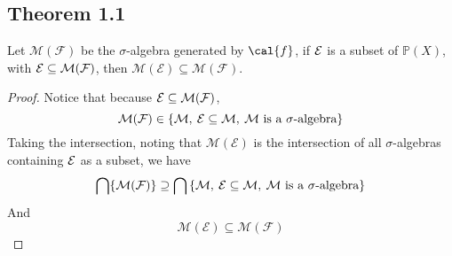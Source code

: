 \documentclass[../../main.tex]{subfiles}
\begin{document}
\newcommand{\me}{\mathcal{M}(\mathcal{E})}
\newcommand{\mf}{\mathcal{M}(\mathcal{F})}
\subsection{Theorem 1.1}
\begin{wts}
    Let $\mf$ be the $\sigma$-algebra generated by $\cal{f}$, if $\cal{E}$ is a subset of $\mathbb{P}(X)$, with $\cal{E}\subseteq\mf$, then $\me\subseteq\mf$.
\end{wts}
\begin{proof}
    Notice that because $\cal{E}\subseteq\mf$, 
    \[
    \mf\in\left\{\cal{M},\:\cal{E}\subseteq \cal{M},\:\text{$\cal{M}$ is a $\sigma$-algebra}\right\}
    \]
    Taking the intersection, noting that $\me$ is the intersection of all $\sigma$-algebras containing $\cal{E}$ as a subset, we have
    \[
    \bigcap \{\mf\}\supseteq \bigcap \left\{\cal{M},\:\cal{E}\subseteq \cal{M},\:\text{$\cal{M}$ is a $\sigma$-algebra}\right\}
    \]
    And
    \[
    \me\subseteq\mf
    \]
\end{proof}
\end{document}

